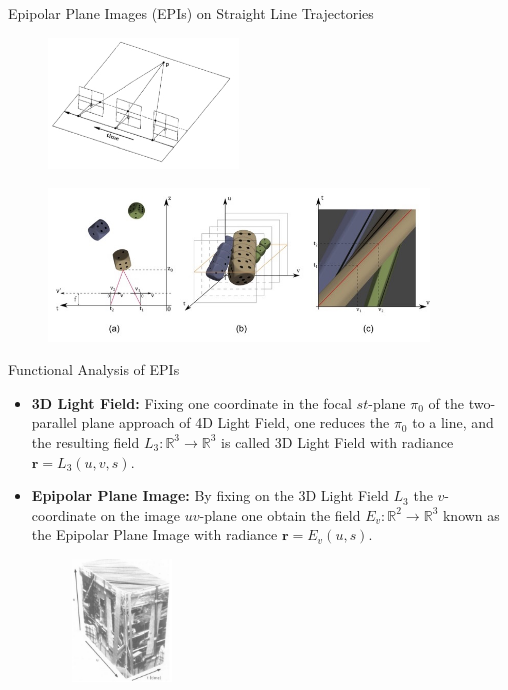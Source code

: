 \begin{frame}{Epipolar Plane Images (EPIs) on Straight Line Trajectories}
\begin{figure}[h!]
\centering
\includegraphics[width=0.45\textwidth]{../../Diagrams/perp-move.jpg}
\end{figure}

\pause
\begin{figure}[h!]
\centering
\includegraphics[width=0.90\textwidth]{../../Diagrams/EPI-dices.jpg}
\end{figure}

\end{frame}

\begin{frame}{Functional Analysis of EPIs}
\begin{block}{}
\begin{itemize}
\item \textbf{3D Light Field:} Fixing one coordinate in the focal $st$-plane $\pi_0$ of the two-parallel plane approach of 4D Light Field, one reduces the $\pi_0$ to a line, and the resulting field $L_3:\mathbb{R}^3\longrightarrow \mathbb{R}^3$ is called 3D Light Field with radiance $\mathbf{r}=L_3(u,v,s)$.

\pause
\item \textbf{Epipolar Plane Image:} By fixing on the 3D Light Field $L_3$ the $v$-coordinate on the image $uv$-plane one obtain the field $E_v:\mathbb{R}^2\longrightarrow \mathbb{R}^3$ known as the Epipolar Plane Image with radiance $\mathbf{r}=E_v(u,s)$.

\pause
\begin{figure}[h!]
\centering
\includegraphics[width=0.25\textwidth]{../../Diagrams/block1.jpg}
\end{figure}
\end{itemize}
\end{block}
\end{frame}

